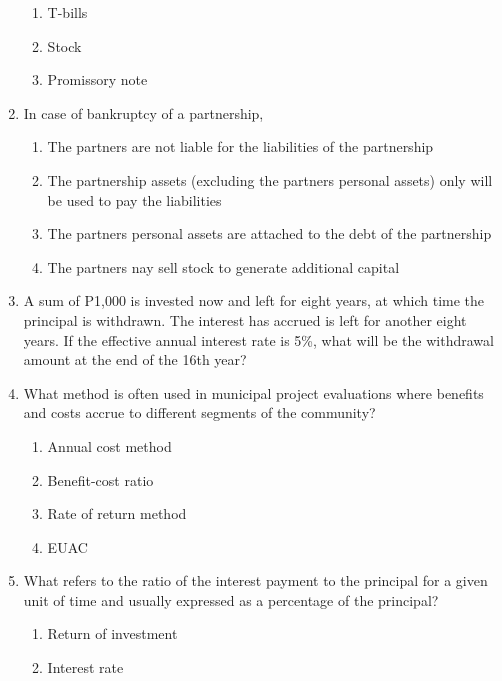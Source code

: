 \documentclass[11pt,a4paper]{article}
\begin{document}
\begin{enumerate}
\begin{enumerate}[label=\Alph*.]
\item{T-bills}
\item{Stock}
\item{Promissory note}
\end{enumerate}
\item{In case of bankruptcy of a partnership,}
\begin{enumerate}[label=\Alph*.]
\item{The partners are not liable for the liabilities of the partnership}
\item{The partnership assets (excluding the partners personal assets) only will be used to pay the liabilities}
\item{The partners personal assets are attached to the debt of the partnership}
\item{The partners nay sell stock to generate additional capital}
\end{enumerate}
\item{A sum of P1,000 is invested now and left for eight years, at which time the principal is withdrawn. The interest has accrued is left for another eight years. If the effective annual interest rate is 5\%, what will be the withdrawal amount at the end of the 16th year?}
\\
\item{What method is often used in municipal project evaluations where benefits and costs accrue to different segments of the community?}
\begin{enumerate}[label=\Alph*.]
\item{Annual cost method}
\item{Benefit-cost ratio}
\item{Rate of return method}
\item{EUAC}
\end{enumerate}
\item{What refers to the ratio of the interest payment to the principal for a given unit of time and usually expressed as a percentage of the principal?}
\begin{enumerate}[label=\Alph*.]
\item{Return of investment}
\item{Interest rate}

\end{enumerate}
\end{enumerate}
\end{document}
